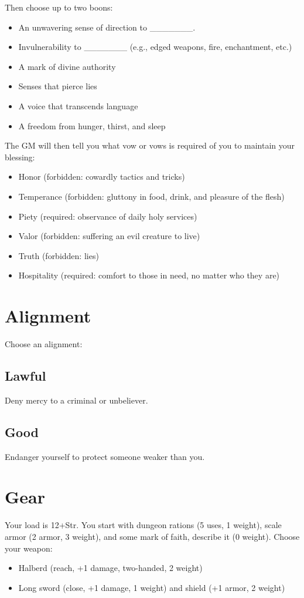  Then choose up to two boons:
\begin{itemize}
\item An unwavering sense of direction to \_\_\_\_\_\_\_.
\item Invulnerability to \_\_\_\_\_\_\_ (e.g., edged weapons, fire, enchantment, etc.)
\item A mark of divine authority
\item Senses that pierce lies
\item A voice that transcends language
\item A freedom from hunger, thirst, and sleep

\end{itemize}


 The GM will then tell you what vow or vows is required of you to maintain your blessing:
\begin{itemize}
\item Honor (forbidden: cowardly tactics and tricks)
\item Temperance (forbidden: gluttony in food, drink, and pleasure of the flesh)
\item Piety (required: observance of daily holy services)
\item Valor (forbidden: suffering an evil creature to live)
\item Truth (forbidden: lies)
\item Hospitality (required: comfort to those in need, no matter who they are)

\end{itemize}
\section{Alignment}


 Choose an alignment:
\subsection{Lawful}


 Deny mercy to a criminal or unbeliever.
\subsection{Good}


 Endanger yourself to protect someone weaker than you.
\section{Gear}


 Your load is 12+Str. You start with dungeon rations (5 uses, 1 weight), scale armor (2 armor, 3 weight), and some mark of faith, describe it (0 weight). Choose your weapon:
\begin{itemize}
\item Halberd (reach, +1 damage, two-handed, 2 weight)
\item Long sword (close, +1 damage, 1 weight) and shield (+1 armor, 2 weight)

\end{itemize}


